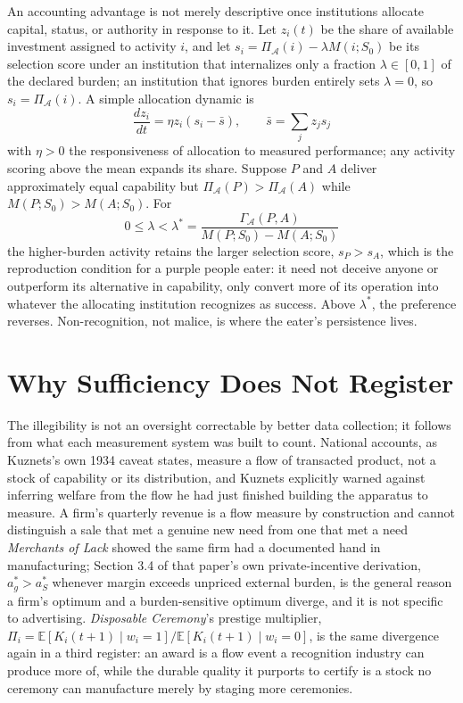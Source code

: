 \documentclass[11pt]{article}
\begin{document}
An accounting advantage is not merely descriptive once institutions allocate capital, status, or authority in response to it. Let $z_i(t)$ be the share of available investment assigned to activity $i$, and let $s_i = \Pi_{\mathcal{A}}(i) - \lambda M(i; S_0)$ be its selection score under an institution that internalizes only a fraction $\lambda \in [0,1]$ of the declared burden; an institution that ignores burden entirely sets $\lambda = 0$, so $s_i = \Pi_{\mathcal{A}}(i)$. A simple allocation dynamic is
\[
\frac{dz_i}{dt} = \eta z_i(s_i - \bar{s}), \qquad \bar{s} = \sum_j z_j s_j
\]
with $\eta > 0$ the responsiveness of allocation to measured performance; any activity scoring above the mean expands its share. Suppose $P$ and $A$ deliver approximately equal capability but $\Pi_{\mathcal{A}}(P) > \Pi_{\mathcal{A}}(A)$ while $M(P; S_0) > M(A; S_0)$. For
\[
0 \leq \lambda < \lambda^{*} = \frac{\Gamma_{\mathcal{A}}(P, A)}{M(P; S_0) - M(A; S_0)}
\]
the higher-burden activity retains the larger selection score, $s_P > s_A$, which is the reproduction condition for a purple people eater: it need not deceive anyone or outperform its alternative in capability, only convert more of its operation into whatever the allocating institution recognizes as success. Above $\lambda^{*}$, the preference reverses. Non-recognition, not malice, is where the eater's persistence lives.

\section{Why Sufficiency Does Not Register}

The illegibility is not an oversight correctable by better data collection; it follows from what each measurement system was built to count. National accounts, as Kuznets's own 1934 caveat states, measure a flow of transacted product, not a stock of capability or its distribution, and Kuznets explicitly warned against inferring welfare from the flow he had just finished building the apparatus to measure. A firm's quarterly revenue is a flow measure by construction and cannot distinguish a sale that met a genuine new need from one that met a need \emph{Merchants of Lack} showed the same firm had a documented hand in manufacturing; Section 3.4 of that paper's own private-incentive derivation, $a_g^{*} > a_S^{*}$ whenever margin exceeds unpriced external burden, is the general reason a firm's optimum and a burden-sensitive optimum diverge, and it is not specific to advertising. \emph{Disposable Ceremony}'s prestige multiplier, $\Pi_i = \mathbb{E}[K_i(t+1) \mid w_i=1] / \mathbb{E}[K_i(t+1) \mid w_i=0]$, is the same divergence again in a third register: an award is a flow event a recognition industry can produce more of, while the durable quality it purports to certify is a stock no ceremony can manufacture merely by staging more ceremonies.
\end{document}
